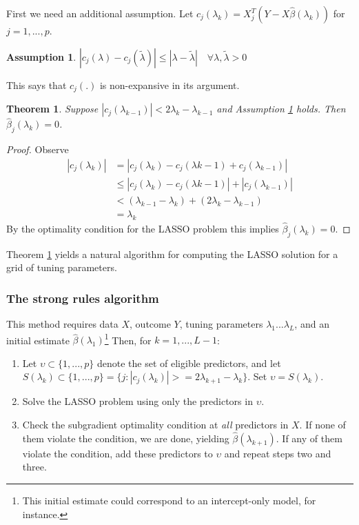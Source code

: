 \documentclass{amsart}
\newtheorem{assumption}{Assumption}
\newtheorem{theorem}{Theorem}
\begin{document}
\bigskip

First we need an additional assumption. Let $c_j(\lambda_k) = X_j^T(Y -
X\hat{\beta}(\lambda_k))$ for $j = 1, ..., p$. 

\begin{assumption}\label{a1}
$|c_j(\lambda) - c_j(\tilde{\lambda})| \leq |\lambda - \tilde{\lambda}| \quad
\forall \lambda, \tilde{\lambda} > 0$
\end{assumption}

This says that $c_j(.)$ is non-expansive in its argument.

\begin{theorem}\label{t1}
	Suppose $|c_j(\lambda_{k-1})| < 2\lambda_k - \lambda_{k-1}$ and
	Assumption \ref{a1} holds. Then $\hat{\beta}_j(\lambda_k) = 0$. 
\end{theorem}

\begin{proof}
	Observe
	\begin{align*}
		|c_j(\lambda_k)| &= |c_j(\lambda_k) - c_j(\lambda{k-1}) + c_j(\lambda_{k-1})| \\
		&\leq |c_j(\lambda_k) - c_j(\lambda{k-1})| + |c_j(\lambda_{k-1})| \\
		&< (\lambda_{k-1} - \lambda_k) + (2\lambda_k - \lambda_{k-1}) \\
		&= \lambda_k
	\end{align*}	
	By the optimality condition for the LASSO problem this implies
	$\hat{\beta}_j(\lambda_k) = 0$. 
\end{proof}

Theorem \ref{t1} yields a natural algorithm for computing the LASSO solution for
a grid of tuning parameters.

\subsubsection{The strong rules algorithm}

This method requires data $X$, outcome $Y$, tuning parameters $\lambda_1 ...
\lambda_L$, and an initial estimate $\hat{\beta}(\lambda_1)$\footnote{This
initial estimate could correspond to an intercept-only model, for instance.}
Then, for $k = 1, ..., L-1$:

\begin{enumerate}[I]
	\item Let $\upsilon \subset \{1, ..., p\}$ denote the set of eligible predictors, and
	let $S(\lambda_k) \subset \{1,...,p\} = \{j : |c_j(\lambda_k)| >=
	2\lambda_{k+1} - \lambda_k \}$. Set $\upsilon = S(\lambda_k)$. 
	\item Solve the LASSO problem using only the predictors in $\upsilon$. 
	\item Check the subgradient optimality condition at \textit{all}
	predictors in $X$. If none of them violate the condition, we are done, yielding $\hat{\beta}(\lambda_{k+1})$. If any of them violate the condition, add these
	predictors to $\upsilon$ and repeat steps two and three.
\end{enumerate}
\end{document}
